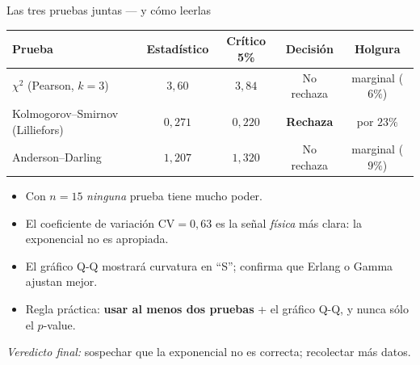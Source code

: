 \documentclass[aspectratio=1610, 10pt]{beamer}
\begin{document}
\begin{frame}{Las tres pruebas juntas — y cómo leerlas}
  \begin{center}\small
    \renewcommand{\arraystretch}{1.2}
    \begin{tabular}{lcccc}
      \toprule
      \textbf{Prueba} & \textbf{Estadístico} & \textbf{Crítico 5\%} & \textbf{Decisión} & \textbf{Holgura} \\
      \midrule
      $\chi^2$ (Pearson, $k{=}3$) & $3{,}60$ & $3{,}84$ & No rechaza & marginal ($6\%$) \\
      Kolmogorov--Smirnov (Lilliefors) & $0{,}271$ & $0{,}220$ & \textbf{Rechaza} & por $23\%$ \\
      Anderson--Darling               & $1{,}207$ & $1{,}320$ & No rechaza & marginal ($9\%$) \\
      \bottomrule
    \end{tabular}
  \end{center}

  \vspace{6pt}
  \begin{notabox}
    \small
    \begin{itemize}\itemsep1pt
      \item Con $n=15$ \emph{ninguna} prueba tiene mucho poder.
      \item El coeficiente de variación $\mathrm{CV}=0{,}63$ es la señal \emph{física} más clara: la exponencial no es apropiada.
      \item El gráfico Q-Q mostrará curvatura en ``S''; confirma que Erlang o Gamma ajustan mejor.
      \item Regla práctica: \textbf{usar al menos dos pruebas} + el gráfico Q-Q, y nunca
        sólo el $p$-value.
    \end{itemize}
  \end{notabox}

  \vspace{2pt}
  \emph{Veredicto final:} sospechar que la exponencial no es correcta; recolectar más datos.
\end{frame}

\end{document}
